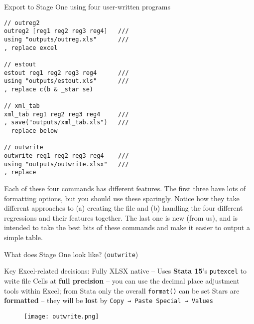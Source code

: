 \documentclass[aspectratio=169]{beamer}
\begin{document}
\begin{frame}[fragile]{Export to Stage One using four user-written programs}
\begin{multicols}{2}
\begin{lstlisting}
// outreg2
outreg2 [reg1 reg2 reg3 reg4]   ///
using "outputs/outreg.xls"      ///
, replace excel

// estout
estout reg1 reg2 reg3 reg4      ///
using "outputs/estout.xls"      ///
, replace c(b & _star se)

// xml_tab
xml_tab reg1 reg2 reg3 reg4     ///
, save("outputs/xml_tab.xls")   ///
  replace below

// outwrite
outwrite reg1 reg2 reg3 reg4    ///
using "outputs/outwrite.xlsx"   ///
, replace
\end{lstlisting}
\parbox{\linewidth}{
Each of these four commands has different features. The first three have lots of formatting options, but you should use these sparingly.
\newline \newline
Notice how they take different approaches to (a) creating the file and (b) handling the four different regressions and their features together.
\newline \newline
The last one is new (from us), and is intended to take the best bits of these commands and make it easier to output a simple table.
}
\end{multicols}
\end{frame}

\begin{frame}[fragile]{What does Stage One look like? (\texttt{outwrite})}
\begin{multicols}{2}
    Key Excel-related decisions:
    \newline \newline
    Fully XLSX native -- Uses \textbf{Stata 15}'s \texttt{putexcel} to write file
    \newline \newline
    Cells at \textbf{full precision} -- you can use the decimal place adjustment tools within Excel; from Stata only the overall \texttt{format()} can be set
    \newline \newline
    Stars are \textbf{formatted} -- they will be \textbf{lost} by \texttt{Copy → Paste Special → Values}
\begin{figure}
    \centering
    \texttt{[image: outwrite.png]}
\end{figure}
\end{multicols}
\end{frame}
\end{document}
